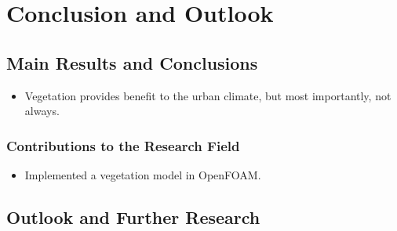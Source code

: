 \chapter{Conclusion and Outlook}
\label{ch:conclusions}

\section{Main Results and Conclusions}

\begin{itemize}
	\item Vegetation provides benefit to the urban climate, but most importantly, not always.
\end{itemize}

\subsection{Contributions to the Research Field}

\begin{itemize}
	\item Implemented a vegetation model in OpenFOAM.
\end{itemize}

\section{Outlook and Further Research}

